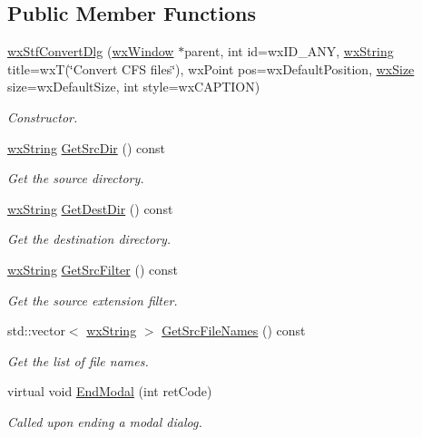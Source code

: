 \subsection*{Public Member Functions}
\begin{DoxyCompactItemize}
\item 
\hyperlink{classwxStfConvertDlg_a1f96707f1cdf3b0e5459ca49bcbc648b}{wxStfConvertDlg} (\hyperlink{classwxWindow}{wxWindow} $\ast$parent, int id=wxID\_\-ANY, \hyperlink{classwxString}{wxString} title=wxT(\char`\"{}Convert CFS files\char`\"{}), wxPoint pos=wxDefaultPosition, \hyperlink{classwxSize}{wxSize} size=wxDefaultSize, int style=wxCAPTION)
\begin{DoxyCompactList}\small\item\em Constructor. \item\end{DoxyCompactList}\item 
\hyperlink{classwxString}{wxString} \hyperlink{classwxStfConvertDlg_addf3c318a648dc3aeb855a2f32416c98}{GetSrcDir} () const 
\begin{DoxyCompactList}\small\item\em Get the source directory. \item\end{DoxyCompactList}\item 
\hyperlink{classwxString}{wxString} \hyperlink{classwxStfConvertDlg_af209dab7add715973cb4efc583e20fa4}{GetDestDir} () const 
\begin{DoxyCompactList}\small\item\em Get the destination directory. \item\end{DoxyCompactList}\item 
\hyperlink{classwxString}{wxString} \hyperlink{classwxStfConvertDlg_a4496190e3ab8965a3fa9d9675881357d}{GetSrcFilter} () const 
\begin{DoxyCompactList}\small\item\em Get the source extension filter. \item\end{DoxyCompactList}\item 
std::vector$<$ \hyperlink{classwxString}{wxString} $>$ \hyperlink{classwxStfConvertDlg_a1fed3038cfba83d7103d2c44ab3d06bd}{GetSrcFileNames} () const 
\begin{DoxyCompactList}\small\item\em Get the list of file names. \item\end{DoxyCompactList}\item 
virtual void \hyperlink{classwxStfConvertDlg_a7271e4bb7b6614f4f3083170564eba8e}{EndModal} (int retCode)
\begin{DoxyCompactList}\small\item\em Called upon ending a modal dialog. \item\end{DoxyCompactList}\end{DoxyCompactItemize}


